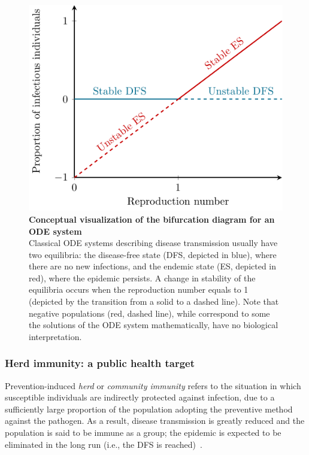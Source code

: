 \begin{figure}[H]
	\centering	
	\includegraphics{Figures/Intro/TikZ_Bifurcation/TranscriticalBifurcation}
	\caption[ Conceptual visualization of the bifurcation diagram for an ODE system]{%
		{\bf Conceptual visualization of the bifurcation diagram for an ODE system}\\
	Classical ODE systems describing disease transmission usually have two equilibria: the disease-free state (DFS, depicted in blue), where there are no new infections, and the endemic state (ES, depicted in red), where the epidemic persists. A change in stability of the equilibria occurs when the reproduction number equals to 1 (depicted by the transition from a solid to a dashed line). Note that negative populations (red, dashed line), while correspond to some the solutions of the ODE system mathematically, have no biological interpretation.}
	\label{fig:Intro_Bifurcation}
\end{figure}

\subsubsection*{Herd immunity: a public health target} \label{sec:Intro_HerdImmunity}

Prevention-induced \textit{herd} or \textit{community immunity} refers to the situation in which susceptible individuals are indirectly protected against infection, due to a sufficiently large proportion of the population adopting the preventive method against the pathogen. As a result, disease transmission is greatly reduced and the population is said to be immune as a group; the epidemic is expected to be eliminated in the long run (i.e., the DFS is reached)~\cite[]{Porta2014,Fine2011,CDC_Epidemiology,Anderson1992}.

